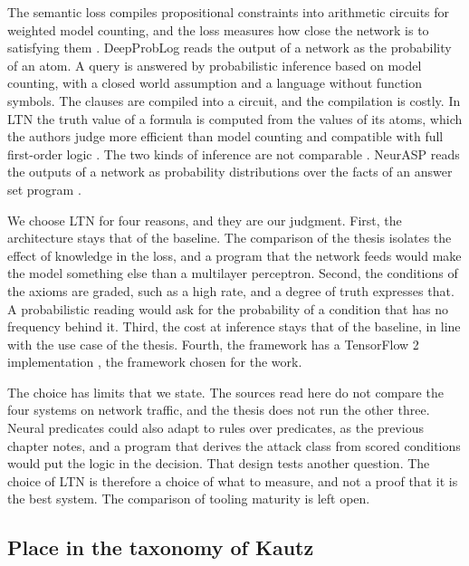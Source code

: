 The semantic loss compiles propositional constraints into arithmetic circuits
for weighted model counting, and the loss measures how close the network is to
satisfying them \citep{badreddine2022ltn}. DeepProbLog
reads the output of a network as the probability of an atom. A query is
answered by probabilistic inference based on model counting, with a closed
world assumption and a language without function symbols. The clauses are
compiled into a circuit, and the compilation is costly. In LTN the truth value
of a formula is computed from the values of its atoms, which the authors judge
more efficient than model counting and compatible with full first-order logic
\citep{badreddine2022ltn}. The two kinds of inference are not comparable
\citep{badreddine2022ltn}. NeurASP reads the outputs of a network as
probability distributions over the facts of an answer set program
\citep{yang2020neurasp}.

We choose LTN for four reasons, and they are our judgment. First, the
architecture stays that of the baseline. The comparison of the thesis isolates
the effect of knowledge in the loss, and a program that the network feeds would
make the model something else than a multilayer perceptron. Second, the
conditions of the axioms are graded, such as a high rate, and a degree of truth
expresses that. A probabilistic reading would ask for the probability of a
condition that has no frequency behind it. Third, the cost at inference stays
that of the baseline, in line with the use case of the thesis. Fourth, the
framework has a TensorFlow 2 implementation \citep{badreddine2022ltn}, the
framework chosen for the work.

The choice has limits that we state. The sources read here do not compare the
four systems on network traffic, and the thesis does not run the other three.
Neural predicates could also adapt to rules over predicates, as the previous
chapter notes, and a program that derives the attack class from scored
conditions would put the logic in the decision. That design tests another
question. The choice of LTN is therefore a choice of what to measure, and not a
proof that it is the best system. The comparison of tooling maturity is left
open.

\subsection{Place in the taxonomy of Kautz}
\label{sec:kautz-place}

